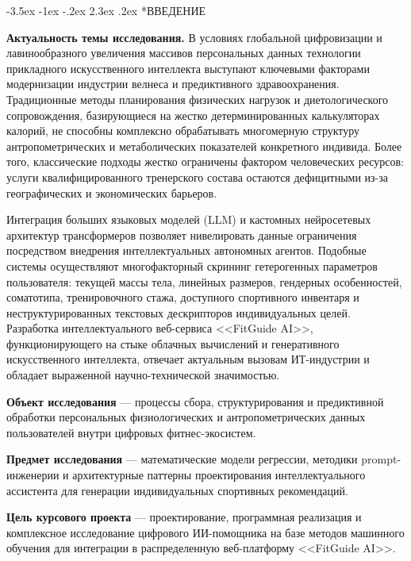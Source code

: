 \documentclass[14pt, a4paper]{extarticle}
\makeatletter
\renewcommand\section{\@startsection {section}{1}{\z@}%
                                   {-3.5ex \@plus -1ex \@minus -.2ex}%
                                   {2.3ex \@plus.2ex}%
                                   {\centering\normalfont\Large\bfseries}}
\makeatother
\begin{document}
\newpage
\tableofcontents
\newpage

\section*{ВВЕДЕНИЕ}

\textbf{Актуальность темы исследования.} В условиях глобальной цифровизации и лавинообразного увеличения массивов персональных данных технологии прикладного искусственного интеллекта выступают ключевыми факторами модернизации индустрии велнеса и предиктивного здравоохранения. Традиционные методы планирования физических нагрузок и диетологического сопровождения, базирующиеся на жестко детерминированных калькуляторах калорий, не способны комплексно обрабатывать многомерную структуру антропометрических и метаболических показателей конкретного индивида. Более того, классические подходы жестко ограничены фактором человеческих ресурсов: услуги квалифицированного тренерского состава остаются дефицитными из-за географических и экономических барьеров.

Интеграция больших языковых моделей (LLM) и кастомных нейросетевых архитектур трансформеров позволяет нивелировать данные ограничения посредством внедрения интеллектуальных автономных агентов. Подобные системы осуществляют многофакторный скрининг гетерогенных параметров пользователя: текущей массы тела, линейных размеров, гендерных особенностей, соматотипа, тренировочного стажа, доступного спортивного инвентаря и неструктурированных текстовых дескрипторов индивидуальных целей. Разработка интеллектуального веб-сервиса <<FitGuide AI>>, функционирующего на стыке облачных вычислений и генеративного искусственного интеллекта, отвечает актуальным вызовам ИТ-индустрии и обладает выраженной научно-технической значимостью.

\textbf{Объект исследования} — процессы сбора, структурирования и предиктивной обработки персональных физиологических и антропометрических данных пользователей внутри цифровых фитнес-экосистем.

\textbf{Предмет исследования} — математические модели регрессии, методики prompt-инженерии и архитектурные паттерны проектирования интеллектуального ассистента для генерации индивидуальных спортивных рекомендаций.

\textbf{Цель курсового проекта} — проектирование, программная реализация и комплексное исследование цифрового ИИ-помощника на базе методов машинного обучения для интеграции в распределенную веб-платформу <<FitGuide AI>>.
\end{document}
